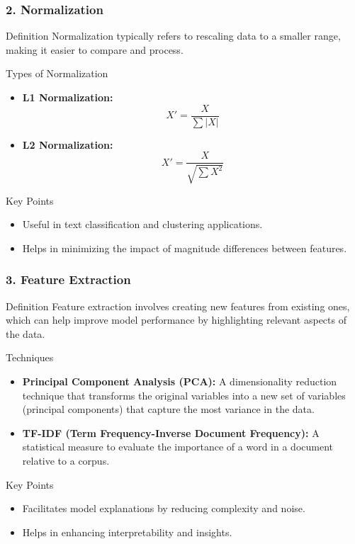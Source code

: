 \documentclass{beamer}
\begin{document}
\begin{frame}
    \frametitle{2. Normalization}
    \begin{block}{Definition}
        Normalization typically refers to rescaling data to a smaller range, making it easier to compare and process.
    \end{block}

    \begin{block}{Types of Normalization}
        \begin{itemize}
            \item \textbf{L1 Normalization:} 
            \[
            X' = \frac{X}{\sum |X|}
            \]
            \item \textbf{L2 Normalization:} 
            \[
            X' = \frac{X}{\sqrt{\sum X^2}}
            \]
        \end{itemize}
    \end{block}
    
    \begin{block}{Key Points}
        \begin{itemize}
            \item Useful in text classification and clustering applications.
            \item Helps in minimizing the impact of magnitude differences between features.
        \end{itemize}
    \end{block}
\end{frame}

\begin{frame}
    \frametitle{3. Feature Extraction}
    \begin{block}{Definition}
        Feature extraction involves creating new features from existing ones, which can help improve model performance by highlighting relevant aspects of the data.
    \end{block}

    \begin{block}{Techniques}
        \begin{itemize}
            \item \textbf{Principal Component Analysis (PCA):} A dimensionality reduction technique that transforms the original variables into a new set of variables (principal components) that capture the most variance in the data. 
            \item \textbf{TF-IDF (Term Frequency-Inverse Document Frequency):} A statistical measure to evaluate the importance of a word in a document relative to a corpus.
        \end{itemize}
    \end{block}

    \begin{block}{Key Points}
        \begin{itemize}
            \item Facilitates model explanations by reducing complexity and noise.
            \item Helps in enhancing interpretability and insights.
        \end{itemize}
    \end{block}
\end{frame}
\end{document}
